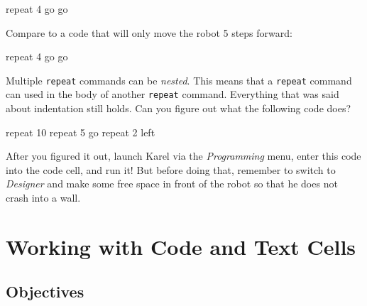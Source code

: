 \begin{bluecode}
repeat 4
    go
    go
\end{bluecode}
Compare to a code that will only move the robot 5 steps forward:

\begin{bluecode}
repeat 4
    go
go
\end{bluecode}
Multiple {\tt repeat} commands can be {\em nested}. This means that a {\tt repeat} command 
can used in the body of another {\tt repeat} command. Everything that was said about indentation 
still holds. Can you figure out what the following code does?

\begin{bluecode}
repeat 10
    repeat 5
        go
    repeat 2
        left
\end{bluecode}
After you figured it out, launch Karel via the {\em Programming} menu, enter this code into
the code cell, and run it! But before doing that, remember to switch to {\em Designer} and make 
some free space in front of the robot 
so that he does not crash into a wall.


\section{Working with Code and Text Cells} \label{sec:editmenu}

\subsection{Objectives} 
 
